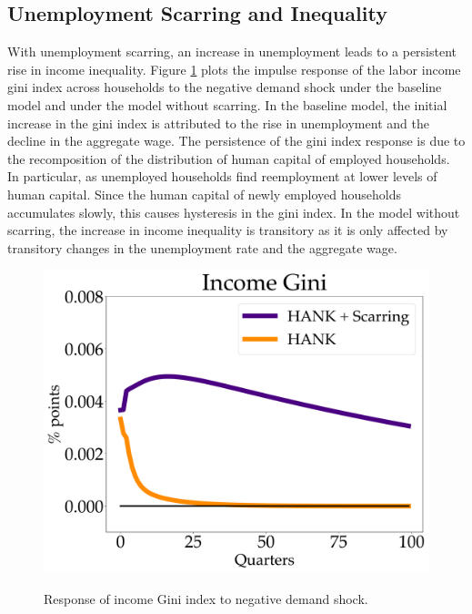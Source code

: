\subsection{Unemployment Scarring and Inequality}

With unemployment scarring, an increase in unemployment leads to a persistent rise in income inequality. Figure \ref{Gini_IPR} plots the impulse response of the labor income gini index across households to the negative demand shock under the baseline model and under the model without scarring. In the baseline model, the initial increase in the gini index is attributed to the rise in unemployment and the decline in the aggregate wage. The persistence of the gini index response is due to the recomposition of the distribution of human capital of employed households. In particular, as unemployed households find reemployment at lower levels of human capital. Since the human capital of newly employed households accumulates slowly, this causes hysteresis in the gini index. In the model without scarring, the increase in income inequality is transitory as it is only affected by transitory changes in the unemployment rate and the aggregate wage.

\begin{figure}[!ht]
   \begin{center}
   \begin{minipage}{0.7\textwidth}
        \centering
        \includegraphics[scale=.3]{text/chapter1/Figures/gini_IPR} %
    \end{minipage}
        \caption{Response of income Gini index to negative demand shock.}
    \label{Gini_IPR}
    \end{center}
  \end{figure}




